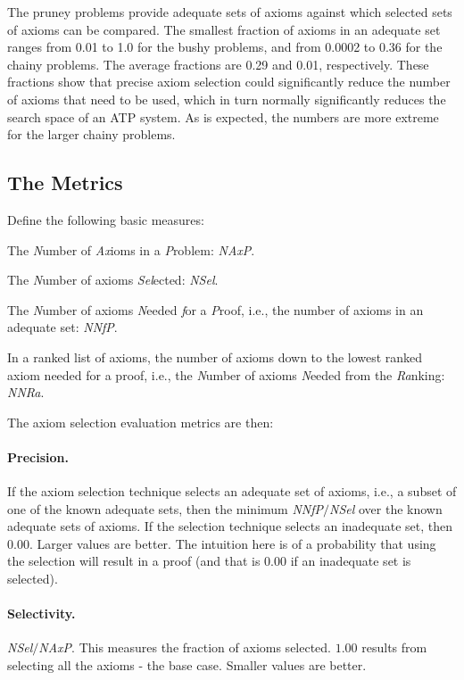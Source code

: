 \documentclass[EPiC]{easychair}
\newenvironment{packed_itemize}{
\vspace*{-0.5em}
\begin{itemize}
  \setlength{\partopsep}{0pt}
  \setlength{\itemsep}{1pt}
  \setlength{\parskip}{0pt}
  \setlength{\parsep}{0pt}
}{\end{itemize}}
\begin{document}
The pruney problems provide adequate sets of axioms against which
selected sets of axioms can be compared.
The smallest fraction of axioms in an adequate set ranges from 0.01 to 1.0
for the bushy problems, and from 0.0002 to 0.36 for the chainy problems.
The average fractions are 0.29 and 0.01, respectively.
These fractions show that precise axiom selection could significantly reduce 
the number of axioms that need to be used, which in turn normally 
significantly reduces the search space of an ATP system.
As is expected, the numbers are more extreme for the larger chainy problems.

\subsection{The Metrics}
\label{TheMetrics}

Define the following basic measures:
\begin{packed_itemize}
\item The \emph{N}umber of \emph{Ax}ioms in a \emph{P}roblem: \emph{NAxP}.
\item The \emph{N}umber of axioms \emph{Sel}ected: \emph{NSel}.
\item The \emph{N}umber of axioms \emph{N}eeded \emph{f}or a \emph{P}roof, 
      i.e., the number of axioms in an adequate set: \emph{NNfP}.
\item In a ranked list of axioms, the number of axioms down to the lowest ranked
      axiom needed for a proof, i.e., the \emph{N}umber of axioms
      \emph{N}eeded from the \emph{Ra}nking: \emph{NNRa}.
\end{packed_itemize}

The axiom selection evaluation metrics are then:

\paragraph{Precision.}
If the axiom selection technique selects an adequate set of axioms, i.e., a 
subset of one of the known adequate sets, then the minimum 
\emph{NNfP}$/$\emph{NSel} over the known adequate sets of axioms.
If the selection technique selects an inadequate set, then $0.00$.
Larger values are better.
The intuition here is of a probability that using the selection will result
in a proof (and that is $0.00$ if an inadequate set is selected).

\paragraph{Selectivity.}
\emph{NSel}$/$\emph{NAxP}.
This measures the fraction of axioms selected.
$1.00$ results from selecting all the axioms - the base case.
Smaller values are better.
\end{document}
